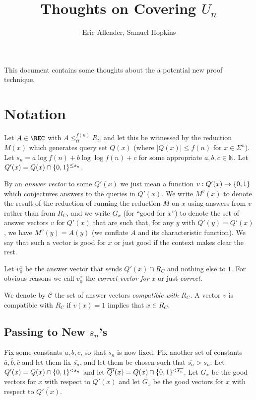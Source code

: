 \documentclass{article}
\title{Thoughts on Covering $U_n$}
\author{Eric Allender, Samuel Hopkins}
\begin{document}
\fancyheadoffset[LE,RO]{0pt}{\marginparsep + \marginparwidth}
\maketitle
This document contains some thoughts about the a potential new proof technique. 
\section{Notation} Let $A \in \REC$ with $A \leq_{tt}^{f(n)} R_C$ and let this be witnessed by the reduction $M(x)$ which generates query set $Q(x)$ (where $|Q(x)| \leq f(n)$ for $x \in \Sigma^n$). Let $s_n = a \log f(n) + b \log \log f(n) + c$ for some appropriate $a,b,c \in \mathbb N$. Let $Q'(x) = Q(x) \cap \{ 0,1 \}^{\leq s_n}$. 
 
By an \emph{answer vector} to some $Q'(x)$ we just mean a function $v : Q'(x) \rightarrow \{ 0,1 \}$ which conjectures answers to the queries in $Q'(x)$. We write $M^v(x)$ to denote the result of the reduction of running the reduction $M$ on $x$ using answers from $v$ rather than from $R_C$, and we write $G_x$ (for ``good for $x$'') to denote the set of answer vectors $v$ for $Q'(x)$ that are such that, for any $y$ with $Q'(y) = Q'(x)$, we have $M^v(y) = A(y)$ (we conflate $A$ and its characteristic function). We say that such a vector is good for $x$ or just good if the context makes clear the rest. 

Let $v_0^x$ be the answer vector that sends $Q'(x) \cap R_C$ and nothing else to $1$. For obvious reasons we call $v_0^x$ the \emph{correct vector for $x$} or just \emph{correct}. 

We denote by $\mathcal C$ the set of answer vectors \emph{compatible with $R_C$}. A vector $v$ is compatible with $R_C$ if $v(x) = 1$ implies that $x \in R_C$. 


\subsection{Passing to New $s_n$'s}
Fix some constants $a,b,c$, so that $s_n$ is now fixed. Fix another set of constants $\overline a,\overline b,\overline c$ and let them fix $\overline {s_n}$, and let them be chosen such that $\overline{s_n} > s_n$. Let $Q'(x) = Q(x) \cap \{ 0,1 \}^{< s_n}$ and let $\overline{Q'}(x) = Q(x) \cap \{ 0,1 \}^{< \overline{s_n}}$. Let $G_x$ be the good vectors for $x$ with respect to $Q'(x)$ and let $\overline{G_x}$ be the good vectors for $x$ with respect to $\overline{Q'(x)}$. 
\end{document}
